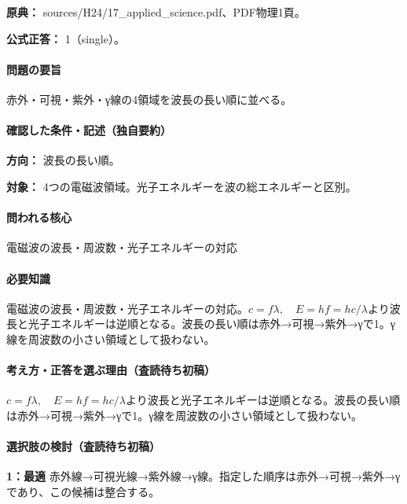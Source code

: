 \noindent\textbf{原典：} sources/H24/17\_applied\_science.pdf、PDF物理1頁。

\textbf{公式正答：} 1（single）。

\paragraph{問題の要旨} 赤外・可視・紫外・γ線の4領域を波長の長い順に並べる。

\paragraph{確認した条件・記述（独自要約）}\mbox{}\par

\noindent\textbf{方向：} 波長の長い順。\par

\noindent\textbf{対象：} 4つの電磁波領域。光子エネルギーを波の総エネルギーと区別。\par

\paragraph{問われる核心} 電磁波の波長・周波数・光子エネルギーの対応

\paragraph{必要知識} 電磁波の波長・周波数・光子エネルギーの対応。\(c=f\lambda,\quad E=hf=hc/\lambda\)より波長と光子エネルギーは逆順となる。波長の長い順は赤外→可視→紫外→γで1。γ線を周波数の小さい領域として扱わない。

\paragraph{考え方・正答を選ぶ理由（査読待ち初稿）} \(c=f\lambda,\quad E=hf=hc/\lambda\)より波長と光子エネルギーは逆順となる。波長の長い順は赤外→可視→紫外→γで1。γ線を周波数の小さい領域として扱わない。

\paragraph{選択肢の検討（査読待ち初稿）}\mbox{}\par

\noindent\textbf{1：最適} 赤外線→可視光線→紫外線→γ線。指定した順序は赤外→可視→紫外→γであり、この候補は整合する。\par

